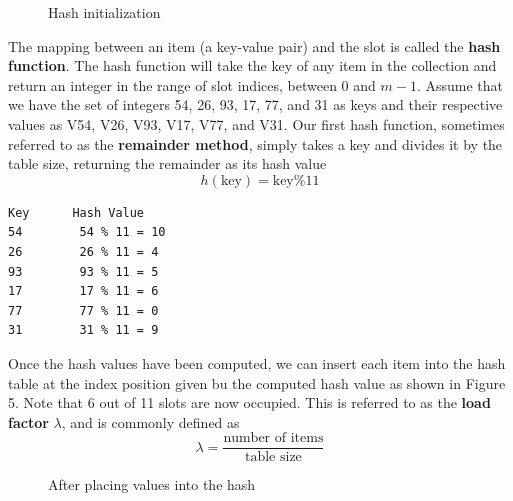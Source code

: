 \documentclass[a4paper,11pt]{book}
\begin{document}
\begin{figure}[ht]
\begin{center}
\end{center}
\caption{Hash initialization}
\end{figure}

\noindent The mapping between an item (a key-value pair) and the slot is called the \textbf{hash function}. The hash function will take the key of any item in the collection and return an integer in the range of slot indices, between 0 and $m-1$. Assume that we have the set of integers 54, 26, 93, 17, 77, and 31 as keys and their respective values as V54, V26, V93, V17, V77, and V31. Our first hash function, sometimes referred to as the \textbf{remainder method}, simply takes a key and divides it by the table size, returning the remainder as its hash value $$h(\text{key})=\text{key} \% 11$$
\begin{lstlisting}
Key      Hash Value
54        54 % 11 = 10
26        26 % 11 = 4
93        93 % 11 = 5
17        17 % 11 = 6
77        77 % 11 = 0
31        31 % 11 = 9
\end{lstlisting}

\noindent Once the hash values have been computed, we can insert each item into the hash table at the index position given bu the computed hash value as shown in Figure 5. Note that 6 out of 11 slots are now occupied. This is referred to as the \textbf{load factor} $\lambda$, and is commonly defined as $$\lambda=\dfrac{\text{number of items}}{\text{table size}}$$

\begin{figure}[ht]
\begin{center}
\end{center}
\caption{After placing values into the hash}
\end{figure}
\end{document}
